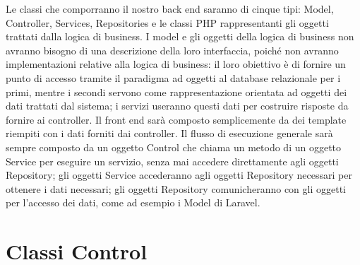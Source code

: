 Le classi che comporranno il nostro back end saranno di cinque tipi: Model, Controller, Services, Repositories e le classi PHP rappresentanti gli oggetti trattati dalla logica di business. I model e gli oggetti della logica di business non avranno bisogno di una descrizione della loro interfaccia, poiché non avranno implementazioni relative alla logica di business: il loro obiettivo è di fornire un punto di accesso tramite il paradigma ad oggetti al database relazionale per i primi, mentre i secondi servono come rappresentazione orientata ad oggetti dei dati trattati dal sistema; i servizi useranno questi dati per costruire risposte da fornire ai controller. Il front end sarà composto semplicemente da dei template riempiti con i dati forniti dai controller. Il flusso di esecuzione generale sarà sempre composto da un oggetto Control che chiama un metodo di un oggetto Service per eseguire un servizio, senza mai accedere direttamente agli oggetti Repository; gli oggetti Service accederanno agli oggetti Repository necessari per ottenere i dati necessari; gli oggetti Repository comunicheranno con gli oggetti per l’accesso dei dati, come ad esempio i Model di Laravel.

\newpage
\section{Classi Control}
